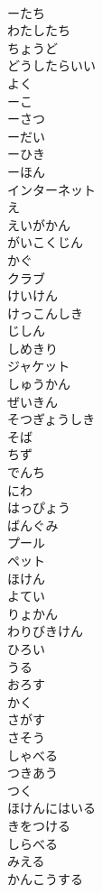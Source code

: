\documentclass[8pt]{extreport}
\begin{document}
\begin{CJK}{UTF8}{min}
\\	ーたち	
\\	わたしたち	
\\	ちょうど	
\\	どうしたらいい	
\\	よく	
\\	ーこ	
\\	ーさつ	
\\	ーだい	
\\	ーひき	
\\	ーほん	
\\	インターネット	
\\	え	
\\	えいがかん	
\\	がいこくじん	
\\	かぐ	
\\	クラブ	
\\	けいけん	
\\	けっこんしき	
\\	じしん	
\\	しめきり	
\\	ジャケット	
\\	しゅうかん	
\\	ぜいきん	
\\	そつぎょうしき	
\\	そば	
\\	ちず	
\\	でんち	
\\	にわ	
\\	はっぴょう	
\\	ばんぐみ	
\\	プール	
\\	ペット	
\\	ほけん	
\\	よてい	
\\	りょかん	
\\	わりびきけん	
\\	ひろい	
\\	うる	
\\	おろす	
\\	かく	
\\	さがす	
\\	さそう	
\\	しゃべる	
\\	つきあう	
\\	つく	
\\	ほけんにはいる	
\\	きをつける	
\\	しらべる	
\\	みえる	
\\	かんこうする	

\end{CJK}
\end{document}
